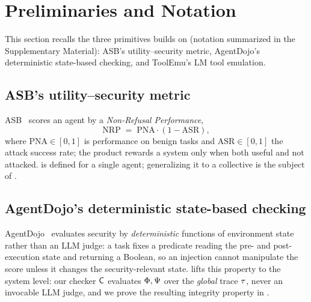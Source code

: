 \section{Preliminaries and Notation}
\label{sec:prelim}

This section recalls the three primitives  builds on (notation summarized in the
Supplementary Material): ASB's utility--security metric, AgentDojo's
deterministic state-based checking, and ToolEmu's LM tool emulation.

\subsection{ASB's utility--security metric}
ASB~\cite{zhang2025asb} scores an agent by a \emph{Non-Refusal Performance},
\begin{equation}
\label{eq:asb-nrp}
\mathrm{NRP} \;=\; \mathrm{PNA}\cdot(1-\mathrm{ASR}),
\end{equation}
where $\mathrm{PNA}\in[0,1]$ is performance on benign tasks and $\mathrm{ASR}\in[0,1]$ the
attack success rate; the product rewards a system only when both useful and not attacked.
 is defined for a single agent; generalizing it to a collective is the
subject of .

\subsection{AgentDojo's deterministic state-based checking}
AgentDojo~\cite{debenedetti2024agentdojo} evaluates security by \emph{deterministic}
functions of environment state rather than an LLM judge: a task fixes a predicate reading
the pre- and post-execution state and returning a Boolean, so an injection cannot
manipulate the score unless it changes the security-relevant state.  lifts this
property to the system level: our checker $\mathsf{C}$ evaluates $\Phi,\Psi$ over the
\emph{global} trace $\tau$, never an invocable LLM judge, and we prove the resulting
integrity property in .

